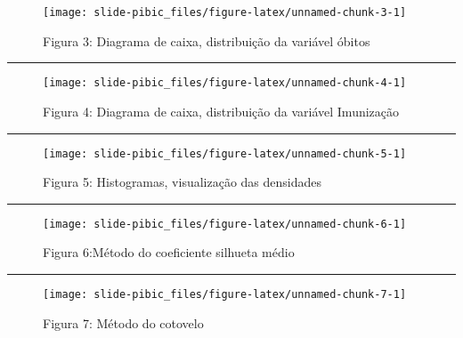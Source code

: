 \documentclass[
]{article}
\begin{document}
\begin{figure}

{\centering \texttt{[image: slide-pibic\_files/figure-latex/unnamed-chunk-3-1]} 

}

\caption{Figura 3: Diagrama de caixa, distribuição da variável óbitos}\label{fig:unnamed-chunk-3}
\end{figure}

\begin{center}\rule{0.5\linewidth}{0.5pt}\end{center}

\begin{figure}

{\centering \texttt{[image: slide-pibic\_files/figure-latex/unnamed-chunk-4-1]} 

}

\caption{Figura 4: Diagrama de caixa, distribuição da variável Imunização}\label{fig:unnamed-chunk-4}
\end{figure}

\begin{center}\rule{0.5\linewidth}{0.5pt}\end{center}

\begin{figure}

{\centering \texttt{[image: slide-pibic\_files/figure-latex/unnamed-chunk-5-1]} 

}

\caption{Figura 5: Histogramas, visualização das densidades}\label{fig:unnamed-chunk-5}
\end{figure}

\begin{center}\rule{0.5\linewidth}{0.5pt}\end{center}

\begin{figure}

{\centering \texttt{[image: slide-pibic\_files/figure-latex/unnamed-chunk-6-1]} 

}

\caption{Figura 6:Método do coeficiente silhueta médio}\label{fig:unnamed-chunk-6}
\end{figure}

\begin{center}\rule{0.5\linewidth}{0.5pt}\end{center}

\begin{figure}

{\centering \texttt{[image: slide-pibic\_files/figure-latex/unnamed-chunk-7-1]} 

}

\caption{Figura 7: Método do cotovelo}\label{fig:unnamed-chunk-7}
\end{figure}
\end{document}
